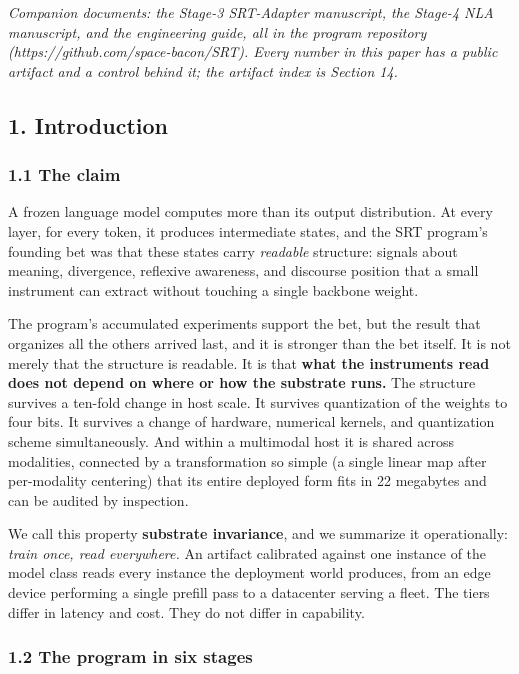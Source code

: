 \documentclass[
  11pt,
]{article}
\begin{document}
\emph{Companion documents: the Stage-3 SRT-Adapter manuscript, the
Stage-4 NLA manuscript, and the engineering guide, all in the program
repository (https://github.com/space-bacon/SRT). Every number in this
paper has a public artifact and a control behind it; the artifact index
is Section 14.}

\subsection{1. Introduction}\label{introduction}

\subsubsection{1.1 The claim}\label{the-claim}

A frozen language model computes more than its output distribution. At
every layer, for every token, it produces intermediate states, and the
SRT program's founding bet was that these states carry \emph{readable}
structure: signals about meaning, divergence, reflexive awareness, and
discourse position that a small instrument can extract without touching
a single backbone weight.

The program's accumulated experiments support the bet, but the result
that organizes all the others arrived last, and it is stronger than the
bet itself. It is not merely that the structure is readable. It is that
\textbf{what the instruments read does not depend on where or how the
substrate runs.} The structure survives a ten-fold change in host scale.
It survives quantization of the weights to four bits. It survives a
change of hardware, numerical kernels, and quantization scheme
simultaneously. And within a multimodal host it is shared across
modalities, connected by a transformation so simple (a single linear map
after per-modality centering) that its entire deployed form fits in 22
megabytes and can be audited by inspection.

We call this property \textbf{substrate invariance}, and we summarize it
operationally: \emph{train once, read everywhere.} An artifact
calibrated against one instance of the model class reads every instance
the deployment world produces, from an edge device performing a single
prefill pass to a datacenter serving a fleet. The tiers differ in
latency and cost. They do not differ in capability.

\subsubsection{1.2 The program in six
stages}\label{the-program-in-six-stages}
\end{document}
